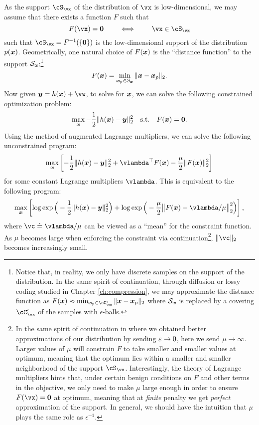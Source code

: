 \documentclass[../../book-main.tex]{subfiles}
\begin{document}
As the support \(\cS_{\vx}\) of the distribution of \(\vx\) is low-dimensional, we may assume that there exists a function \(F\) such that
\begin{equation}
  F(\vx) = \boldsymbol{0} \qquad \iff \qquad \vx \in \cS_{\vx}
\end{equation}
such that \(\cS_{\vx} = F^{-1}(\{\vzero\})\) is the low-dimensional support of the distribution $p(\bm{x})$. Geometrically, one natural choice of $F(\bm{x})$ is the ``distance function'' to the support $\mathcal{S}_{\bm{x}}$:\footnote{Notice that, in reality, we only have discrete samples on the support of the distribution. In the same spirit of continuation, through diffusion or lossy coding studied in Chapter \ref{ch:compression},  we may approximate the distance function as $    F(\x) \approx \min_{\x_p \in \cC_{\vx}^{\epsilon}} \|\x - \x_p\|_2$ where $\mathcal{S}_{\bm{x}}$ is replaced by a covering \(\cC_{\vx}^{\epsilon}\) of the samples with $\epsilon$-balls. }
\begin{equation}
    F(\bm{x}) = \min_{\bm{x}_p \in \mathcal{S}_{\bm{x}}} \|\bm{x} - \bm{x}_p\|_2. 
\end{equation}
Now given $\y = h(\x) +\vw$, to solve for $\bm{x}$, we can solve the following constrained optimization problem:
\begin{equation}
    \max_{\bm{x}} - \frac{1}{2}\|h(\bm{x}) - \bm{y}\|_2^2 \quad \mbox{s.t.} \quad F(\bm{x}) = \boldsymbol{0}. 
\end{equation}
Using the method of augmented Lagrange multipliers, we can solve the following unconstrained program:
\begin{equation}
   \max_{\x} \left[-\frac{1}{2}\|h(\x) - \y\|_2^2  + \vlambda^{\top} F(\x) - \frac{\mu}{2} \|F(\x)\|_2^2\right]
\end{equation}
for some constant Lagrange multipliers $\vlambda$.
This is equivalent to the following program:
\begin{equation}\label{eq:lagrange_multiplier_continuation}
\max_{\x} \left[\log \exp\Big(- \frac{1}{2}\|h(\x) - \y\|_2^2\Big) + \log \exp\Big( - \frac{\mu}{2} \big\|F(\x) - \vlambda/\mu\big\|_2^2\Big)\right],
\end{equation} 
where $\vc \doteq {\vlambda}/{\mu}$ can be viewed as a ``mean''  for the constraint function. As $\mu$ becomes large when enforcing the constraint via continuation\footnote{In the same spirit of continuation in  where we obtained better approximations of our distribution by sending \(\varepsilon \to 0\), here we send \(\mu \to \infty\). Larger values of \(\mu\) will constrain \(F\) to take smaller and smaller values at optimum, meaning that the optimum lies within a smaller and smaller neighborhood of the support \(\cS_{\vx}\). Interestingly, the theory of Lagrange multipliers hints that, under certain benign conditions on \(F\) and other terms in the objective, we only need to make \(\mu\) large enough in order to ensure \(F(\vx) = \vzero\) at optimum, meaning that at \textit{finite} penalty we get \textit{perfect} approximation of the support. In general, we should have the intuition that \(\mu\) plays the same role as  \(\epsilon^{-1}\).}, $\|\vc\|_2$ becomes increasingly small.
\end{document}
